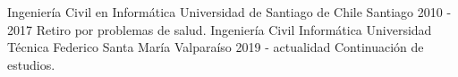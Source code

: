 

\begin{cventries}
  \cventry
    {Ingeniería Civil en Informática} %
    {Universidad de Santiago de Chile} %
    {Santiago} %
    {2010 - 2017} %
    {{Retiro por problemas de salud.}} %
  \cventry
    {Ingeniería Civil Informática} %
    {Universidad Técnica Federico Santa María} %
    {Valparaíso} %
    {2019 - actualidad} %
    {{Continuación de estudios.}} %
\end{cventries}
